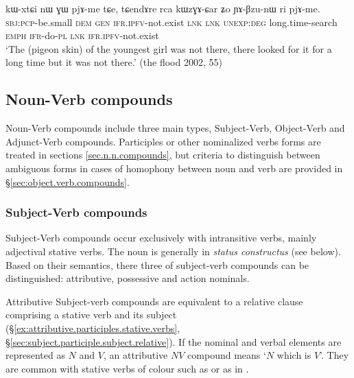 \begin{exe}
\ex \label{ex:kWZGACar}
\gll kɯ-xtɕi nɯ ɣɯ pjɤ-me tɕe, tɕendɤre rca kɯzɣɤ-ɕar ʑo ɲɤ-βzu-nɯ ri pjɤ-me.\\
\textsc{sbj}:\textsc{pcp}-be.small \textsc{dem} \textsc{gen} \textsc{ifr}.\textsc{ipfv}-not.exist \textsc{lnk} \textsc{lnk} \textsc{unexp}:\textsc{deg} long.time-search \textsc{emph} \textsc{ifr}-do-\textsc{pl}  \textsc{lnk} \textsc{ifr}.\textsc{ipfv}-not.exist \\
\glt `The (pigeon skin) of the youngest girl was not there, there looked for it for a long time but it was not there.' (the flood 2002, 55)
\end{exe}

\subsection{Noun-Verb compounds} \label{sec.n.v.compounds}
Noun-Verb compounds include three main types, Subject-Verb, Object-Verb and Adjunct-Verb compounds. Participles or other nominalized verbs forms are treated in sections \ref{sec.n.n.compounds}, but criteria to distinguish between ambiguous forms in cases of homophony between noun and verb are provided in §\ref{sec:object.verb.compounds}.

\subsubsection{Subject-Verb compounds} \label{sec:subject.verb.compounds}
Subject-Verb compounds occur exclusively with intransitive verbs, mainly adjectival stative verbs. The noun is generally in \textit{status constructus} (see  below). Based on their semantics, there three of subject-verb compounds can be distinguished: attributive, possessive and action nominals.

Attributive Subject-verb compounds are equivalent to a relative clause comprising a stative verb and its subject (§\ref{ex:attributive.participles.stative.verbs}, §\ref{sec:subject.participle.subject.relative}). If the nominal and verbal elements are represented as $N$ and $V$, an attributive $NV$ compound means `$N$ which is $V$'. They are common with stative verbs of colour such as  or  as in . 
 
